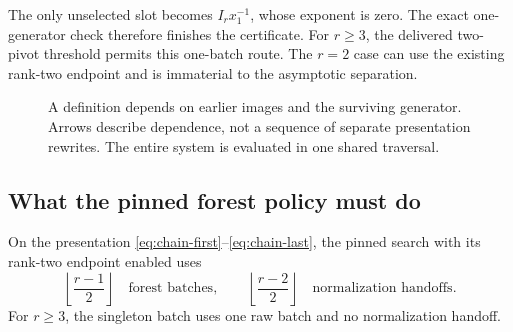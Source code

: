 The only unselected slot becomes $I_r x_1^{-1}$, whose exponent is zero.
The exact one-generator check therefore finishes the certificate. For
$r\geq3$, the delivered two-pivot threshold permits this one-batch route.
The $r=2$ case can use the existing rank-two endpoint and is immaterial to
the asymptotic separation.

\begin{figure}[htbp]
\centering
{}
\caption{A definition depends on earlier images and the surviving generator.
Arrows describe dependence, not a sequence of separate presentation rewrites.
The entire system is evaluated in one shared traversal.}
\label{fig:chain-sharing}
\end{figure}

\subsection{What the pinned forest policy must do}

\begin{proposition}
\label{prop:family-phases}
On the presentation \eqref{eq:chain-first}--\eqref{eq:chain-last}, the pinned
 search with its rank-two endpoint enabled uses
\[
 \left\lfloor\frac{r-1}{2}\right\rfloor
 \quad\text{forest batches},\qquad
 \left\lfloor\frac{r-2}{2}\right\rfloor
 \quad\text{normalization handoffs}.
\]
For $r\geq3$, the singleton batch uses one raw batch and no normalization
handoff.
\end{proposition}

